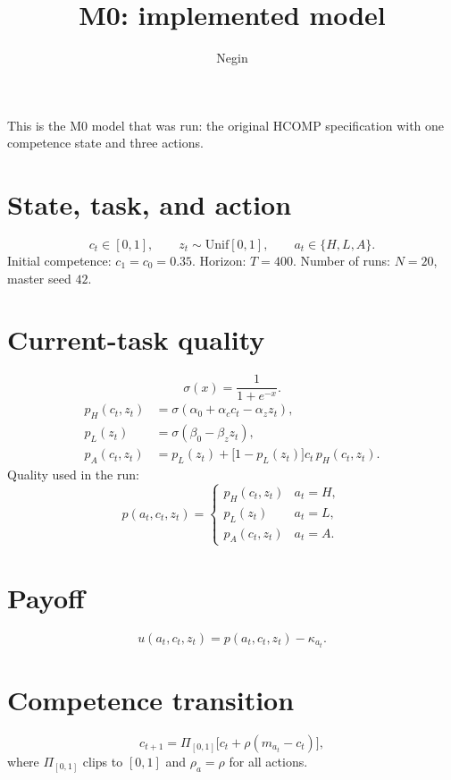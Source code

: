 \documentclass[11pt]{article}
\title{M0: implemented model}
\author{Negin}
\date{}
\begin{document}
\maketitle

\noindent
This is the M0 model that was run: the original HCOMP specification
with one competence state and three actions.

\section{State, task, and action}
\[
c_t\in[0,1],\qquad
z_t\sim\mathrm{Unif}[0,1],\qquad
a_t\in\{H,L,A\}.
\]
Initial competence: \(c_1=c_0=0.35\).
Horizon: \(T=400\).
Number of runs: \(N=20\), master seed \(42\).

\section{Current-task quality}
\[
\sigma(x)=\frac{1}{1+e^{-x}}.
\]
\begin{align}
p_H(c_t,z_t)
&=\sigma(\alpha_0+\alpha_c c_t-\alpha_z z_t),
\label{eq:pH}\\
p_L(z_t)
&=\sigma(\beta_0-\beta_z z_t),
\label{eq:pL}\\
p_A(c_t,z_t)
&=p_L(z_t)+\bigl[1-p_L(z_t)\bigr]c_t\,p_H(c_t,z_t).
\label{eq:pA}
\end{align}
Quality used in the run:
\[
p(a_t,c_t,z_t)
=
\begin{cases}
p_H(c_t,z_t) & a_t=H,\\
p_L(z_t) & a_t=L,\\
p_A(c_t,z_t) & a_t=A.
\end{cases}
\]

\section{Payoff}
\[
u(a_t,c_t,z_t)=p(a_t,c_t,z_t)-\kappa_{a_t}.
\label{eq:u}
\]

\section{Competence transition}
\[
c_{t+1}
=\Pi_{[0,1]}\bigl[c_t+\rho(m_{a_t}-c_t)\bigr],
\label{eq:trans}
\]
where \(\Pi_{[0,1]}\) clips to \([0,1]\) and \(\rho_a=\rho\) for all actions.
\end{document}
